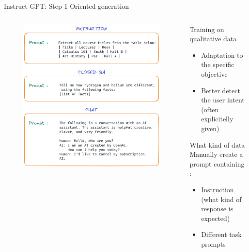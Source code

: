 \documentclass[10pt,aspectratio=169]{beamer}
\begin{document}
\begin{frame}{Instruct GPT: Step 1 Oriented generation}

    \begin{columns}
        \begin{column}{0.6\textwidth}  %
            \begin{figure}
                \centering
                \includegraphics[width=.8\textwidth]{media/prompt_exemple.png}
                
                
            \end{figure}
        \end{column}
        \begin{column}{0.5\textwidth}
            \begin{alertblock}{Training on qualitative data}
                \begin{itemize}
                    \item Adaptation to the specific objective
                    \item Better detect the user intent (often explicitelly given)
                \end{itemize}
            
            \end{alertblock}
            \begin{alertblock}{What kind of data}
                Manually create a prompt containing : 
                \begin{itemize}
                    \item Instruction (what kind of response is expected)
                    \item Different task prompts
                \end{itemize}
                
            \end{alertblock}
        \end{column}

    \end{columns}
\end{frame}
\end{document}
